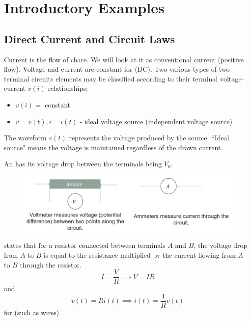 
\chapter{Introductory Examples}


\section{Direct Current and Circuit Laws}

Current is the flow of chare. We will look at it as conventional current (positive flow). Voltage and current are constant for  (DC). Two various types of two-terminal circuits elements may be classified according to their terminal voltage-current $v(i)$ relationships: \begin{itemize}
    \item $v(i) = $ constant
    \item $v = v(t), i = i(t)$ - ideal voltage source (independent voltage source)
\end{itemize}

\begin{defn}
    The waveform $v(t)$ represents the voltage produced by the source. ``Ideal source" means the voltage is maintained regardless of the drawn current.
\end{defn}

\begin{defn}
    An  has its voltage drop between the terminals being $V_0$.
\end{defn}

\begin{figure}[H]
    \centering
    \includegraphics[scale = 0.6]{Images/TH1.PNG}
\end{figure}

\begin{defn}
     states that for a resistor connected between terminals $A$ and $B$, the voltage drop from $A$ to $B$ is equal to the resistance multiplied by the current flowing from $A$ to $B$ through the resistor. \begin{equation*}
        I = \frac{V}{R}\implies V = IR
    \end{equation*}
    and \begin{equation*}
        v(t) = Ri(t)\implies i(t) = \frac{1}{R}v(t)
    \end{equation*}
    for  (such as wires)
\end{defn}

